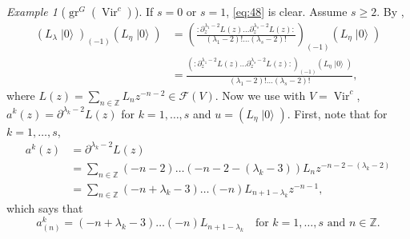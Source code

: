 \documentclass[a4paper, 12pt, reqno]{amsart}
\theoremstyle{remark}
\newtheorem{example}[theorem]{Example}
\numberwithin{equation}{subsection}
\DeclareMathOperator{\Vir}{Vir}
\DeclareMathOperator{\gr}{gr}
\DeclareMathOperator{\vac}{|0\rangle}
\begin{document}
\begin{example}[$\gr^G(\Vir^c)$]
  If $s = 0$ or $s = 1$, \eqref{eq:48} is clear.
  Assume $s \ge 2$.
  By ,
  \begin{align*}
    (L_\lambda\vac)_{(-1)}(L_{\eta}\vac) &= \left(\frac{:\partial_z^{\lambda_1 - 2}L(z)\dots\partial_z^{\lambda_s - 2}L(z):}{(\lambda_1 - 2)!\dots(\lambda_s - 2)!} \right)_{(-1)}(L_{\eta}\vac) \\
    &= \frac{(:\partial_z^{\lambda_1 - 2}L(z)\dots\partial_z^{\lambda_s - 2}L(z):)_{(-1)}(L_{\eta}\vac)}{(\lambda_1 - 2)!\dots(\lambda_s - 2)!},
  \end{align*}
  where $L(z) = \sum_{n \in \mathbb{Z}}L_nz^{-n - 2} \in \mathcal{F}(V)$.
  Now we use  with $V = \Vir^c$, $a^k(z) = \partial^{\lambda_k - 2}L(z)$ for $k = 1, \dots, s$ and $u = (L_{\eta}\vac)$.
  First, note that for $k = 1, \dots, s$,
  \begin{align*}
    a^k(z) &= \partial^{\lambda_k - 2}L(z) \\
    &= \sum_{n \in \mathbb{Z}}(-n - 2)\dots(-n - 2 - (\lambda_k - 3))L_nz^{-n - 2 - (\lambda_k - 2)} \\
    &= \sum_{n \in \mathbb{Z}}(-n + \lambda_k - 3)\dots(-n)L_{n + 1 - \lambda_k}z^{-n - 1},
  \end{align*}
  which says that
  \begin{equation*}
    a^k_{(n)} = (-n + \lambda_k - 3)\dots(-n)L_{n + 1 - \lambda_k} \quad \text{for }k = 1, \dots, s\text{ and }n \in \mathbb{Z}.
  \end{equation*}
  

\end{example}
\end{document}
